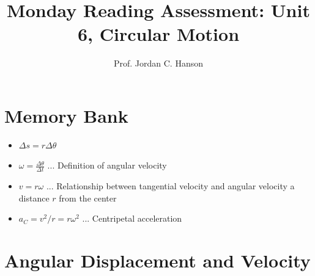 \documentclass{article}
\begin{document}
\title{Monday Reading Assessment: Unit 6, Circular Motion}
\author{Prof. Jordan C. Hanson}

\maketitle

\section{Memory Bank}

\begin{itemize}
\item $\Delta s = r \Delta \theta$
\item $\omega = \frac{\Delta \theta}{\Delta t}$ ... Definition of angular velocity
\item $v = r\omega $ ... Relationship between tangential velocity and angular velocity a distance $r$ from the center
\item $a_C = v^2/r = r \omega^2$ ... Centripetal acceleration
\end{itemize}

\section{Angular Displacement and Velocity}
\end{document}
